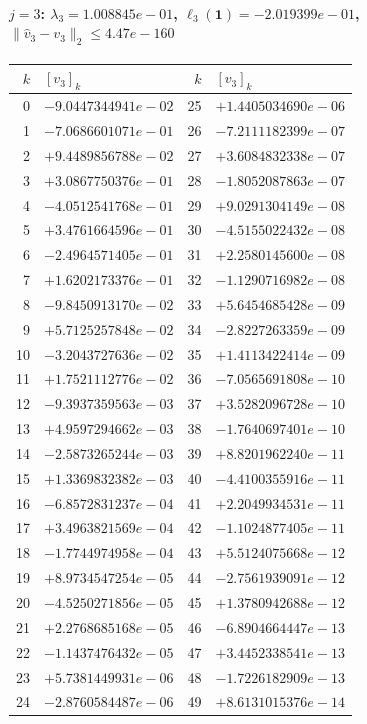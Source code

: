 \documentclass[11pt]{article}
\begin{document}
\paragraph{$j = 3$: $\lambda_{3} = 1.008845e-01$, \quad $\ell_{3}(\mathbf{1}) = -2.019399e-01$, \quad $\|\hat{v}_{3} - v_{3}\|_2 \leq 4.47e-160$}
\begin{center}
{\footnotesize
\begin{tabular}{r@{\;\;}l@{\quad}r@{\;\;}l}
\toprule
$k$ & $[v_{3}]_k$ & $k$ & $[v_{3}]_k$ \\
\midrule
0 & $-9.0447344941e-02$ & 25 & $+1.4405034690e-06$ \\
1 & $-7.0686601071e-01$ & 26 & $-7.2111182399e-07$ \\
2 & $+9.4489856788e-02$ & 27 & $+3.6084832338e-07$ \\
3 & $+3.0867750376e-01$ & 28 & $-1.8052087863e-07$ \\
4 & $-4.0512541768e-01$ & 29 & $+9.0291304149e-08$ \\
5 & $+3.4761664596e-01$ & 30 & $-4.5155022432e-08$ \\
6 & $-2.4964571405e-01$ & 31 & $+2.2580145600e-08$ \\
7 & $+1.6202173376e-01$ & 32 & $-1.1290716982e-08$ \\
8 & $-9.8450913170e-02$ & 33 & $+5.6454685428e-09$ \\
9 & $+5.7125257848e-02$ & 34 & $-2.8227263359e-09$ \\
10 & $-3.2043727636e-02$ & 35 & $+1.4113422414e-09$ \\
11 & $+1.7521112776e-02$ & 36 & $-7.0565691808e-10$ \\
12 & $-9.3937359563e-03$ & 37 & $+3.5282096728e-10$ \\
13 & $+4.9597294662e-03$ & 38 & $-1.7640697401e-10$ \\
14 & $-2.5873265244e-03$ & 39 & $+8.8201962240e-11$ \\
15 & $+1.3369832382e-03$ & 40 & $-4.4100355916e-11$ \\
16 & $-6.8572831237e-04$ & 41 & $+2.2049934531e-11$ \\
17 & $+3.4963821569e-04$ & 42 & $-1.1024877405e-11$ \\
18 & $-1.7744974958e-04$ & 43 & $+5.5124075668e-12$ \\
19 & $+8.9734547254e-05$ & 44 & $-2.7561939091e-12$ \\
20 & $-4.5250271856e-05$ & 45 & $+1.3780942688e-12$ \\
21 & $+2.2768685168e-05$ & 46 & $-6.8904664447e-13$ \\
22 & $-1.1437476432e-05$ & 47 & $+3.4452338541e-13$ \\
23 & $+5.7381449931e-06$ & 48 & $-1.7226182909e-13$ \\
24 & $-2.8760584487e-06$ & 49 & $+8.6131015376e-14$ \\
\bottomrule
\end{tabular}
}
\end{center}
\end{document}
